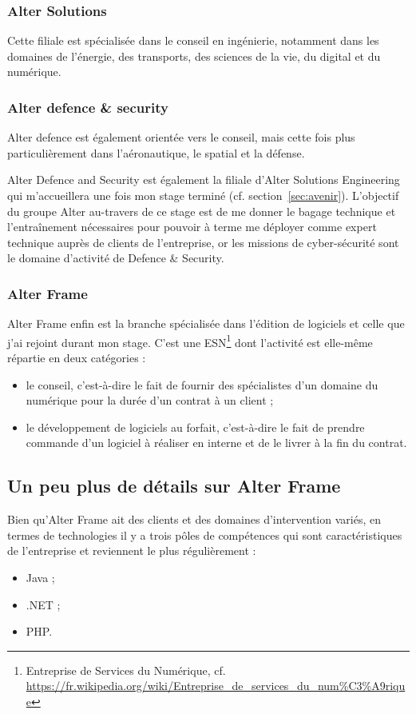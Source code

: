 \subsubsection{Alter Solutions}
Cette filiale est spécialisée dans le conseil en ingénierie, notamment dans les domaines de l'énergie, des transports, des sciences de la vie, du digital et du numérique.

\subsubsection{Alter defence \& security}
Alter defence est également orientée vers le conseil, mais cette fois plus particulièrement dans l'aéronautique, le spatial et la défense.

Alter Defence and Security est également la filiale d'Alter Solutions Engineering qui m'accueillera une fois mon stage terminé (cf. section~\ref{sec:avenir}). L'objectif du groupe Alter au-travers de ce stage est de me donner le bagage technique et l'entraînement nécessaires pour pouvoir à terme me déployer comme expert technique auprès de clients de l'entreprise, or les missions de cyber-sécurité sont le domaine d'activité de Defence \& Security.

\subsubsection{Alter Frame}
Alter Frame enfin est la branche spécialisée dans l'édition de logiciels et celle que j'ai rejoint durant mon stage. C'est une ESN\footnote{Entreprise de Services du Numérique, cf. \url{https://fr.wikipedia.org/wiki/Entreprise_de_services_du_num\%C3\%A9rique}} dont l'activité est elle-même répartie en deux catégories :
\begin{itemize}[label=$\bullet$]
	\item le conseil, c'est-à-dire le fait de fournir des spécialistes d'un domaine du numérique pour la durée d'un contrat à un client ;
	\item le développement de logiciels au forfait, c'est-à-dire le fait de prendre commande d'un logiciel à réaliser en interne et de le livrer à la fin du contrat.
\end{itemize}

\subsection{Un peu plus de détails sur Alter Frame}
\label{subsec:frame}
Bien qu'Alter Frame ait des clients et des domaines d'intervention variés, en termes de technologies il y a trois pôles de compétences qui sont caractéristiques de l'entreprise et reviennent le plus régulièrement :
\begin{itemize}[label=$\bullet$]
	\item Java ;
	\item .NET ;
	\item PHP.
\end{itemize}

